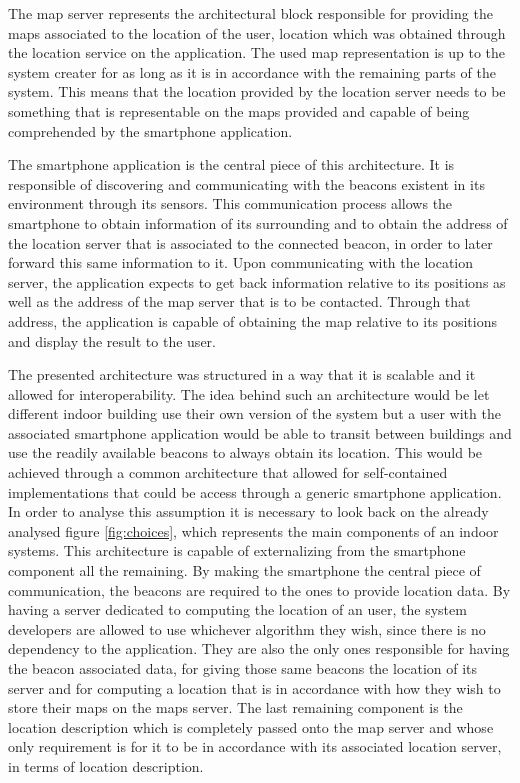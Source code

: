 \documentclass[a4paper]{IEEEtran}
\begin{document}
The map server represents the architectural block responsible for providing the maps associated to the location of the user, location which was obtained through the location service on the application. The used map representation is up to the system creater for as long as it is in accordance with the remaining parts of the system. This means that the location provided by the location server needs to be something that is representable on the maps provided and capable of being comprehended by the smartphone application. 


The smartphone application is the central piece of this architecture. It is responsible of discovering and communicating with the beacons existent in its environment through its sensors. This communication process allows the smartphone to obtain information of its surrounding and to obtain the address of the location server that is associated to the connected beacon, in order to later forward this same information to it. Upon communicating with the location server, the application expects to get back information relative to its positions as well as the address of the map server that is to be contacted. Through that address, the application is capable of obtaining the map relative to its positions and display the result to the user.

The presented architecture was structured in a way that it is scalable and it allowed for interoperability. The idea behind such an architecture would be let different indoor building use their own version of the system but a user with the associated smartphone application would be able to transit between buildings and use the readily available beacons to always obtain its location. This would be achieved through a common architecture that allowed for self-contained implementations that could be access through a generic smartphone application. In order to analyse this assumption it is necessary to look back on the already analysed figure \ref{fig:choices}, which represents the main components of an indoor systems. This architecture is capable of externalizing from the smartphone component all the remaining. By making the smartphone the central piece of communication, the beacons are required to the ones to provide location data. By having a server dedicated to computing the location of an user, the system developers are allowed to use whichever algorithm they wish, since there is no dependency to the application. They are also the only ones responsible for having the beacon associated data, for giving those same beacons the location of its server and for computing a location that is in accordance with how they wish to store their maps on the maps server. The last remaining component is the location description which is completely passed onto the map server and whose only requirement is for it to be in accordance with its associated location server, in terms of location description.
\end{document}
